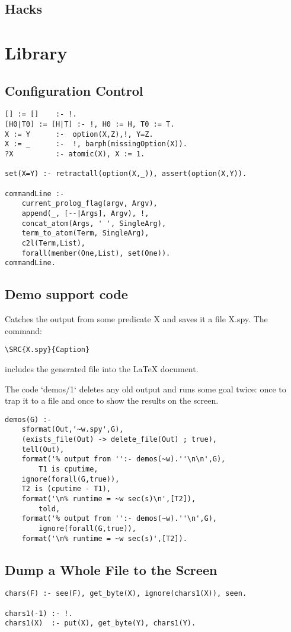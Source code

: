 \documentclass[twocolumn,global]{svjour}
\begin{document}
\subsection{ Hacks
}
\section{ Library
}
\subsection{ Configuration Control }\begin{Verbatim}
[] := []    :- !.
[H0|T0] := [H|T] :- !, H0 := H, T0 := T.
X := Y      :-  option(X,Z),!, Y=Z.
X := _      :-  !, barph(missingOption(X)).
?X          :- atomic(X), X := 1.

set(X=Y) :- retractall(option(X,_)), assert(option(X,Y)).

commandLine :-
	current_prolog_flag(argv, Argv),
	append(_, [--|Args], Argv), !,
	concat_atom(Args, ' ', SingleArg),
	term_to_atom(Term, SingleArg),
	c2l(Term,List),
	forall(member(One,List), set(One)).
commandLine.
\end{Verbatim}
\subsection{ Demo support code
}

Catches the output from some predicate X
and saves it a file X.spy. The command:

{\scriptsize
\begin{verbatim}
\SRC{X.spy}{Caption}
\end{verbatim}}
\noindent
includes the generated file into the {\LaTeX} document.

The code `demos/1` deletes any old output and runs some goal twice: once
to trap it to a file and once to show the results on the screen.  \begin{Verbatim}
demos(G) :-
	sformat(Out,'~w.spy',G),
	(exists_file(Out) -> delete_file(Out) ; true),
	tell(Out),
	format('% output from '':- demos(~w).''\n\n',G),
        T1 is cputime,
	ignore(forall(G,true)),
	T2 is (cputime - T1),
	format('\n% runtime = ~w sec(s)\n',[T2]),
        told,
	format('% output from '':- demos(~w).''\n',G),  
        ignore(forall(G,true)),
	format('\n% runtime = ~w sec(s)',[T2]).
\end{Verbatim}
\subsection{ Dump a Whole File to the Screen}\begin{Verbatim}
chars(F) :- see(F), get_byte(X), ignore(chars1(X)), seen.
    
chars1(-1) :- !.
chars1(X)  :- put(X), get_byte(Y), chars1(Y).
\end{Verbatim}
\end{document}
